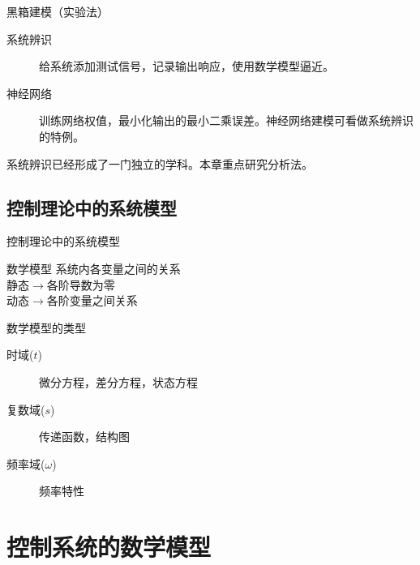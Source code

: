 \documentclass[handout,cjkutf8,table,aspectratio=1610]{beamer} %
\begin{document}
\begin{frame}{黑箱建模（实验法）}
\begin{description}
\item[系统辨识]给系统添加测试信号，记录输出响应，使用数学模型逼近。
\item[神经网络]训练网络权值，最小化输出的最小二乘误差。神经网络建模可看做系统辨识的特例。
\end{description}
系统辨识已经形成了一门独立的学科。本章重点研究分析法。
\end{frame}

\subsection{控制理论中的系统模型}
\begin{frame}{控制理论中的系统模型}
\begin{block}{数学模型}
系统内各变量之间的关系\\
静态$\longrightarrow$各阶导数为零\\
动态$\longrightarrow$各阶变量之间关系
\end{block}
\begin{block}{数学模型的类型}
\begin{description}
\item[时域($t$)]微分方程，差分方程，状态方程
\item[复数域($s$)]传递函数，结构图
\item[频率域($\omega$)]频率特性
\end{description}
\end{block}
\end{frame}

\section[控制系统的数学模型]{控制系统的数学模型}
\end{document}
